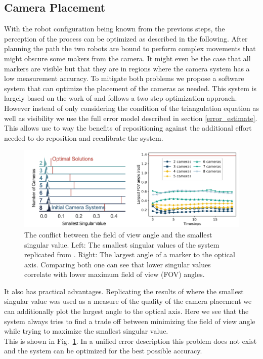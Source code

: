 \documentclass[5p,times,procedia]{elsarticle}
\begin{document}
\subsection{Camera Placement}
With the robot configuration being known from the previous steps, the perception of the process can be optimized as described in the following.
After planning the path the two robots are bound to perform complex movements that might obscure some makers from the camera.
It might even be the case that all markers are visible but that they are in regions where the camera system has a low measurement accuracy.
To mitigate both problems we propose a software system that can optimize the placement of the cameras as needed.
This system is largely based on the work of \cite{camera_placement} and follows a two step optimization approach.
However instead of only considering the condition of the triangulation equation as well as visibility we use the full error model described in section \ref{error_estimate}.
This allows use to way the benefits of repositioning against the additional effort needed to do reposition and recalibrate the system.
%
\begin{figure}[!htb]
	\centering
	\includegraphics[width=0.95\columnwidth]{graphics/fov_sv_conflict.png}
	\caption{The conflict between the field of view angle and the smallest singular value. Left: The smallest singular values of the system replicated from \cite{camera_placement}. Right: The largest angle of a marker to the optical axis.
		Comparing both one can see that lower singular values correlate with lower maximum field of view (FOV) angles.}
	\label{fig:fov_sv_conflict}
\end{figure}
%
It also has practical advantages.
Replicating the results of \cite{camera_placement} where the smallest singular value was used as a measure of the quality of the camera placement we can additionally plot the largest angle to the optical axis.
Here we see that the system always tries to find a trade off between minimizing the field of view angle while trying to maximize the smallest singular value.\\
This is shown in Fig.~\ref{fig:fov_sv_conflict}.
In a unified error description this problem does not exist and the system can be optimized for the best possible accuracy.
%
%
\end{document}
